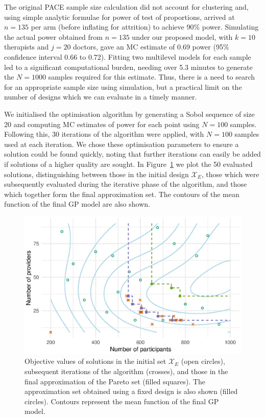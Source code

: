 \documentclass[sagev, doublespace, Crown]{sagej}
\begin{document}
The original PACE sample size calculation did not account for clustering and, using simple analytic formulae for power of test of proportions, arrived at $n = 135$ per arm (before inflating for attrition) to achieve 90\% power. Simulating the actual power obtained from $n=135$ under our proposed model, with $k = 10$ therapists and $j = 20$ doctors, gave an MC estimate of 0.69 power (95\% confidence interval 0.66 to 0.72). Fitting two multilevel models for each sample led to a significant computational burden, needing over 5.3 minutes to generate the $N=1000$ samples required for this estimate. Thus, there is a need to search for an appropriate sample size using simulation, but a practical limit on the number of designs which we can evaluate in a timely manner. 

We initialised the optimisation algorithm by generating a Sobol sequence of size 20 and computing MC estimates of power for each point using $N = 100$ samples. Following this, 30 iterations of the algorithm were applied, with $N = 100$ samples used at each iteration. We chose these optimisation parameters to ensure a solution could be found quickly, noting that further iterations can easily be added if solutions of a higher quality are sought. In Figure~\ref{fig:ex1_single_run} we plot the 50 evaluated solutions, distinguishing between those in the initial design $\mathcal{X}_{E}$, those which were subsequently evaluated during the iterative phase of the algorithm, and those which together form the final approximation set. The contours of the mean function of the final GP model are also shown. 

\begin{figure}
\centering
\includegraphics[scale=0.8]{fig4_ex1_single_run.eps}
\caption{Objective values of solutions in the initial set $\mathcal{X}_{E}$ (open circles), subsequent iterations of the algorithm (crosses), and those in the final approximation of the Pareto set (filled squares). The approximation set obtained using a fixed design is also shown (filled circles). Contours represent the mean function of the final GP model.}
\label{fig:ex1_single_run}
\end{figure}
\end{document}
